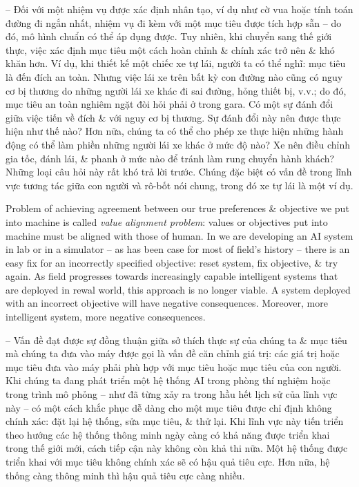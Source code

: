 \documentclass{article}
\begin{document}
\begin{itemize}
\begin{itemize}
\begin{itemize}
\begin{itemize}
				-- Đối với một nhiệm vụ được xác định nhân tạo, ví dụ như cờ vua hoặc tính toán đường đi ngắn nhất, nhiệm vụ đi kèm với một mục tiêu được tích hợp sẵn -- do đó, mô hình chuẩn có thể áp dụng được. Tuy nhiên, khi chuyển sang thế giới thực, việc xác định mục tiêu một cách hoàn chỉnh \& chính xác trở nên \& khó khăn hơn. Ví dụ, khi thiết kế một chiếc xe tự lái, người ta có thể nghĩ: mục tiêu là đến đích an toàn. Nhưng việc lái xe trên bất kỳ con đường nào cũng có nguy cơ bị thương do những người lái xe khác đi sai đường, hỏng thiết bị, v.v.; do đó, mục tiêu an toàn nghiêm ngặt đòi hỏi phải ở trong gara. Có một sự đánh đổi giữa việc tiến về đích \& với nguy cơ bị thương. Sự đánh đổi này nên được thực hiện như thế nào? Hơn nữa, chúng ta có thể cho phép xe thực hiện những hành động có thể làm phiền những người lái xe khác ở mức độ nào? Xe nên điều chỉnh gia tốc, đánh lái, \& phanh ở mức nào để tránh làm rung chuyển hành khách? Những loại câu hỏi này rất khó trả lời trước. Chúng đặc biệt có vấn đề trong lĩnh vực tương tác giữa con người và rô-bốt nói chung, trong đó xe tự lái là một ví dụ.
				
				Problem of achieving agreement between our true preferences \& objective we put into machine is called {\it value alignment problem}: values or objectives put into machine must be aligned with those of human. In we are developing an AI system in lab or in a simulator -- as has been case for most of field's history -- there is an easy fix for an incorrectly specified objective: reset system, fix objective, \& try again. As field progresses towards increasingly capable intelligent systems that are deployed in rewal world, this approach is no longer viable. A system deployed with an incorrect objective will have negative consequences. Moreover, more intelligent system, more negative consequences.
				
				-- Vấn đề đạt được sự đồng thuận giữa sở thích thực sự của chúng ta \& mục tiêu mà chúng ta đưa vào máy được gọi là vấn đề căn chỉnh giá trị: các giá trị hoặc mục tiêu đưa vào máy phải phù hợp với mục tiêu hoặc mục tiêu của con người. Khi chúng ta đang phát triển một hệ thống AI trong phòng thí nghiệm hoặc trong trình mô phỏng -- như đã từng xảy ra trong hầu hết lịch sử của lĩnh vực này -- có một cách khắc phục dễ dàng cho một mục tiêu được chỉ định không chính xác: đặt lại hệ thống, sửa mục tiêu, \& thử lại. Khi lĩnh vực này tiến triển theo hướng các hệ thống thông minh ngày càng có khả năng được triển khai trong thế giới mới, cách tiếp cận này không còn khả thi nữa. Một hệ thống được triển khai với mục tiêu không chính xác sẽ có hậu quả tiêu cực. Hơn nữa, hệ thống càng thông minh thì hậu quả tiêu cực càng nhiều.
				

\end{itemize}
\end{itemize}
\end{itemize}
\end{itemize}
\end{document}
